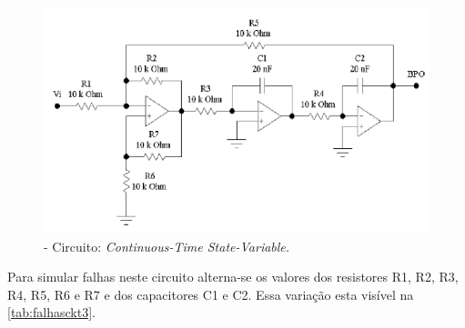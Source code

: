 \begin{enumerate}
\begin{figure}[H]
\begin{center}
\includegraphics[width=12cm]{./04_Cap4/figures/ctsvckt.png}
\caption{\label{fig:Circuito3}- Circuito: {\textit{ Continuous-Time State-Variable.}}}
\end{center}
\end{figure}

Para simular falhas neste circuito alterna-se os valores dos resistores R1, R2, R3, R4, R5, R6 e R7 e dos capacitores C1 e C2. Essa variação esta visível na \ref{tab:falhasckt3}.
 
 


\end{enumerate}
